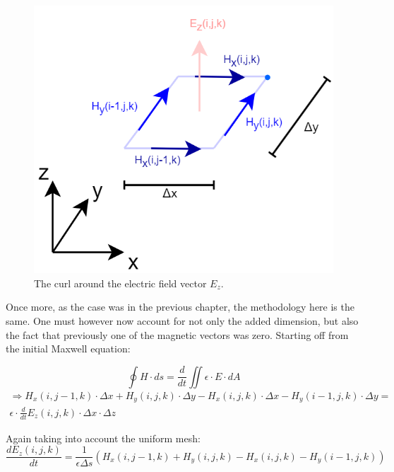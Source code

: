 \begin{figure}[h!]
	\centering
	\includegraphics[scale=0.5]{Figures/fdtd3dEzCurl}
	\decoRule
	\caption[3D $E_z$ vector curl]{The curl around the electric field vector $E_z$.}
	\label{fig:fdtd3dEzCurl}
\end{figure}

Once more, as the case was in the previous chapter, the methodology here is the same. One must however now account for not only the added dimension, but also the fact that previously one of the magnetic vectors was zero.
Starting off from the initial Maxwell equation:

\begin{equation}
	\label{eqn:magneticIntegral}
	\oint H \cdot ds = \frac{d}{dt} \iint \epsilon \cdot E \cdot dA
\end{equation}
\begin{multline}
	\label{eqn:3dEzCurl1}
	\Rightarrow H_x(i,j-1,k) \cdot \Delta x + H_y(i,j,k) \cdot \Delta y - H_x(i,j,k) \cdot \Delta x - H_y(i-1,j,k) \cdot \Delta y =\\ \epsilon \cdot \frac{d}{dt} E_z(i,j,k) \cdot \Delta x \cdot \Delta z
\end{multline}

Again taking into account the uniform mesh:
\begin{equation}
	\label{eqn:3dEzCurl2}
	\frac{d E_z(i,j,k)}{dt} = \frac{1}{\epsilon \Delta s} (H_x(i,j-1,k) + H_y(i,j,k) - H_x(i,j,k) - H_y(i-1,j,k))
\end{equation}

